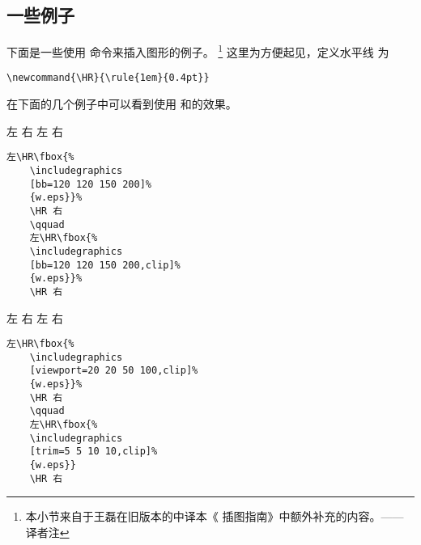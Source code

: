 \subsection{一些例子}

下面是一些使用  命令来插入图形的例子。
\footnote{
	本小节来自于王磊在旧版本的中译本《\LaTeXe{} 插图指南》中额外补充的内容。——译者注}
这里为方便起见，定义水平线  为
\begin{lstlisting}
\newcommand{\HR}{\rule{1em}{0.4pt}}
\end{lstlisting}

\ifpdf\else %
在下面的几个例子中可以看到使用 和的效果。

\hspace{-1cm}\begin{minipage}[c]{.5\textwidth}
	左\HR%
	\HR 右
	\qquad
	左\HR%
	\HR 右
\end{minipage}%
\begin{minipage}[c]{.5\textwidth}
	\begin{Verbatim}[frame=lines,label=\colorbox{green}{\small 例一},labelposition=topline,]
	左\HR\fbox{%
	\includegraphics
	[bb=120 120 150 200]%
	{w.eps}}%
	\HR 右
	\qquad
	左\HR\fbox{%
	\includegraphics
	[bb=120 120 150 200,clip]%
	{w.eps}}%
	\HR 右
	\end{Verbatim}
\end{minipage}

\hspace{-1.5cm}\begin{minipage}[c]{.65\textwidth}
	左\HR\fbox{%
		\texttt{[image: w]}}%
	\HR 右
	\qquad
	左\HR\fbox{%
		\texttt{[image: w]}}%
	\HR 右
\end{minipage}%
\hspace{-1cm}\begin{minipage}[c]{.5\textwidth}
	\begin{Verbatim}[frame=lines,label=\colorbox{green}{\small 例二},labelposition=topline]
	左\HR\fbox{%
	\includegraphics
	[viewport=20 20 50 100,clip]%
	{w.eps}}%
	\HR 右
	\qquad
	左\HR\fbox{%
	\includegraphics
	[trim=5 5 10 10,clip]%
	{w.eps}}
	\HR 右
	\end{Verbatim}
	\par\vspace{0pt}
\end{minipage}
\fi

